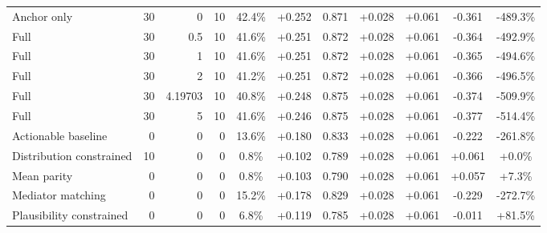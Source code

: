 \begin{table}[htbp]
\begin{tabular}{lrrrccccccc}
Anchor only & 30 & 0 & 10 & 42.4\% & +0.252 & 0.871 & +0.028 & +0.061 & -0.361 & -489.3\% \\
Full & 30 & 0.5 & 10 & 41.6\% & +0.251 & 0.872 & +0.028 & +0.061 & -0.364 & -492.9\% \\
Full & 30 & 1 & 10 & 41.6\% & +0.251 & 0.872 & +0.028 & +0.061 & -0.365 & -494.6\% \\
Full & 30 & 2 & 10 & 41.2\% & +0.251 & 0.872 & +0.028 & +0.061 & -0.366 & -496.5\% \\
Full & 30 & 4.19703 & 10 & 40.8\% & +0.248 & 0.875 & +0.028 & +0.061 & -0.374 & -509.9\% \\
Full & 30 & 5 & 10 & 41.6\% & +0.246 & 0.875 & +0.028 & +0.061 & -0.377 & -514.4\% \\
Actionable baseline & 0 & 0 & 0 & 13.6\% & +0.180 & 0.833 & +0.028 & +0.061 & -0.222 & -261.8\% \\
Distribution constrained & 10 & 0 & 0 & 0.8\% & +0.102 & 0.789 & +0.028 & +0.061 & +0.061 & +0.0\% \\
Mean parity & 0 & 0 & 0 & 0.8\% & +0.103 & 0.790 & +0.028 & +0.061 & +0.057 & +7.3\% \\
Mediator matching & 0 & 0 & 0 & 15.2\% & +0.178 & 0.829 & +0.028 & +0.061 & -0.229 & -272.7\% \\
Plausibility constrained & 0 & 0 & 0 & 6.8\% & +0.119 & 0.785 & +0.028 & +0.061 & -0.011 & +81.5\% \\
\bottomrule
\end{tabular}
\end{table}